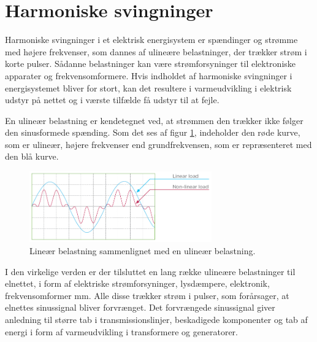 
\section{Harmoniske svingninger}
\label{sec:THD}
Harmoniske svingninger i et elektrisk energisystem er spændinger og strømme med højere frekvenser, som dannes af ulineære belastninger, der trækker strøm i korte pulser. Sådanne belastninger kan være strømforsyninger til elektroniske apparater og frekvensomformere. Hvis indholdet af harmoniske svingninger i energisystemet bliver for stort, kan det resultere i varmeudvikling i elektrisk udstyr på nettet og i værste tilfælde få udstyr til at fejle. \newline

En ulineær belastning er kendetegnet ved, at strømmen den trækker ikke følger den sinusformede spænding.  Som det ses af figur \ref{fig:nonLinear}, indeholder den røde kurve, som er ulineær, højere frekvenser end grundfrekvensen, som er repræsenteret med den blå kurve. 


\begin{figure}[H] %
	\centering
	\includegraphics[width=0.7\textwidth]{figure/nonLinear}
	\caption{Lineær belastning sammenlignet med en ulineær belastning.}
	\label{fig:nonLinear}
\end{figure}

I den virkelige verden er der tilsluttet en lang række ulineære belastninger til elnettet, i form af elektriske strømforsyninger, lysdæmpere, elektronik, frekvensomformer mm. Alle disse trækker strøm i pulser, som forårsager, at elnettes sinussignal bliver forvrænget. Det forvrængede sinussignal giver anledning til større tab i transmissionslinjer, beskadigede komponenter og tab af energi i form af varmeudvikling i transformere og generatorer. \newline

